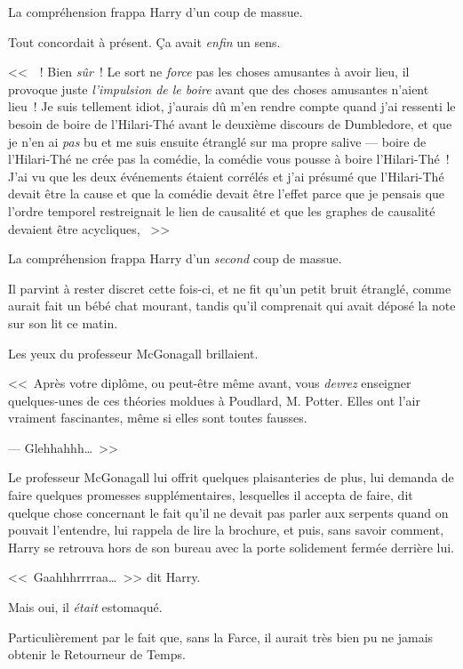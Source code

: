 La compréhension frappa Harry d'un coup de massue.

Tout concordait à présent. Ça avait \emph{enfin} un sens.

<<~~! Bien \emph{sûr}~! Le sort ne \emph{force} pas les choses amusantes à avoir lieu, il provoque juste \emph{l'impulsion de le boire} avant que des choses amusantes n'aient lieu~! Je suis tellement idiot, j'aurais dû m'en rendre compte quand j'ai ressenti le besoin de boire de l'Hilari-Thé avant le deuxième discours de Dumbledore, et que je n'en ai \emph{pas} bu et me suis ensuite étranglé sur ma propre salive — boire de l'Hilari-Thé ne crée pas la comédie, la comédie vous pousse à boire l'Hilari-Thé~! J'ai vu que les deux événements étaient corrélés et j'ai présumé que l'Hilari-Thé devait être la cause et que la comédie devait être l'effet parce que je pensais que l'ordre temporel restreignait le lien de causalité et que les graphes de causalité devaient être acycliques, ~>>

La compréhension frappa Harry d'un \emph{second} coup de massue.

Il parvint à rester discret cette fois-ci, et ne fit qu'un petit bruit étranglé, comme aurait fait un bébé chat mourant, tandis qu'il comprenait qui avait déposé la note sur son lit ce matin.

Les yeux du professeur McGonagall brillaient.

<<~Après votre diplôme, ou peut-être même avant, vous \emph{devrez} enseigner quelques-unes de ces théories moldues à Poudlard, M. Potter. Elles ont l'air vraiment fascinantes, même si elles sont toutes fausses.

--- Glehhahhh…~>>

Le professeur McGonagall lui offrit quelques plaisanteries de plus, lui demanda de faire quelques promesses supplémentaires, lesquelles il accepta de faire, dit quelque chose concernant le fait qu'il ne devait pas parler aux serpents quand on pouvait l'entendre, lui rappela de lire la brochure, et puis, sans savoir comment, Harry se retrouva hors de son bureau avec la porte solidement fermée derrière lui.

<<~Gaahhhrrrraa…~>> dit Harry.

Mais oui, il \emph{était} estomaqué.

Particulièrement par le fait que, sans la Farce, il aurait très bien pu ne jamais obtenir le Retourneur de Temps.

